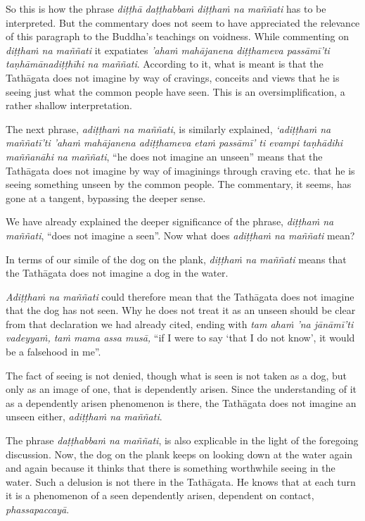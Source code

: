 So this is how the phrase \emph{diṭṭhā daṭṭhabbaṁ diṭṭhaṁ na maññati} has to be interpreted. But the commentary does not seem to have appreciated the relevance of this paragraph to the Buddha's teachings on voidness. While commenting on \emph{diṭṭhaṁ na maññati} it expatiates \emph{'ahaṁ mahājanena diṭṭhameva passāmī'ti taṇhāmānadiṭṭhīhi na maññati}. According to it, what is meant is that the Tathāgata does not imagine by way of cravings, conceits and views that he is seeing just what the common people have seen. This is an oversimplification, a rather shallow interpretation.

The next phrase, \emph{adiṭṭhaṁ na maññati}, is similarly explained, \emph{`adiṭṭhaṁ na maññatī'ti 'ahaṁ mahājanena adiṭṭhameva etaṁ passāmī' ti evampi taṇhādihi maññanāhi na maññati}, ``he does not imagine an unseen'' means that the Tathāgata does not imagine by way of imaginings through craving etc. that he is seeing something unseen by the common people. The commentary, it seems, has gone at a tangent, bypassing the deeper sense.

We have already explained the deeper significance of the phrase, \emph{diṭṭhaṁ na maññati}, ``does not imagine a seen''. Now what does \emph{adiṭṭhaṁ na maññati} mean?

In terms of our simile of the dog on the plank, \emph{diṭṭhaṁ na maññati} means that the Tathāgata does not imagine a dog in the water.

\emph{Adiṭṭhaṁ na maññati} could therefore mean that the Tathāgata does not imagine that the dog has not seen. Why he does not treat it as an unseen should be clear from that declaration we had already cited, ending with \emph{tam ahaṁ 'na jānāmī'ti vadeyyaṁ, taṁ mama assa musā,} ``if I were to say `that I do not know', it would be a falsehood in me''.

The fact of seeing is not denied, though what is seen is not taken as a dog, but only as an image of one, that is dependently arisen. Since the understanding of it as a dependently arisen phenomenon is there, the Tathāgata does not imagine an unseen either, \emph{adiṭṭhaṁ na maññati}.

The phrase \emph{daṭṭhabbaṁ na maññati}, is also explicable in the light of the foregoing discussion. Now, the dog on the plank keeps on looking down at the water again and again because it thinks that there is something worthwhile seeing in the water. Such a delusion is not there in the Tathāgata. He knows that at each turn it is a phenomenon of a seen dependently arisen, dependent on contact, \emph{phassapaccayā}.

